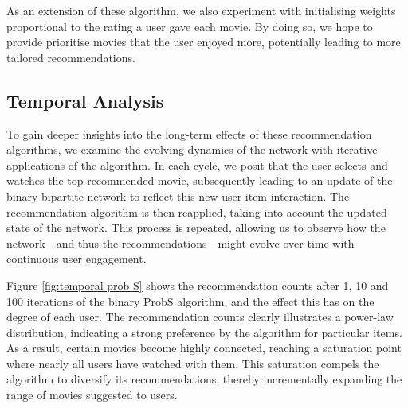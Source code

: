 \documentclass[12pt]{article}
\numberwithin{equation}{section}
\begin{document}
As an extension of these algorithm, we also experiment with initialising weights proportional to the rating a user gave each movie. By doing so, we hope to provide prioritise movies that the user enjoyed more, potentially leading to more tailored recommendations. 


\subsection{Temporal Analysis}

To gain deeper insights into the long-term effects of these recommendation algorithms, we examine the evolving dynamics of the network with iterative applications of the algorithm. In each cycle, we posit that the user selects and watches the top-recommended movie, subsequently leading to an update of the binary bipartite network to reflect this new user-item interaction. The recommendation algorithm is then reapplied, taking into account the updated state of the network. This process is repeated, allowing us to observe how the network—and thus the recommendations—might evolve over time with continuous user engagement.

Figure \ref{fig:temporal prob S} shows the recommendation counts after 1,  10 and 100 iterations of the binary ProbS algorithm, and the effect this has on the degree of each user.  The recommendation counts clearly illustrates a power-law distribution, indicating a strong preference by the algorithm for particular items. As a result, certain movies become highly connected, reaching a saturation point where nearly all users have watched with them. This saturation compels the algorithm to diversify its recommendations, thereby incrementally expanding the range of movies suggested to users. 
\end{document}
